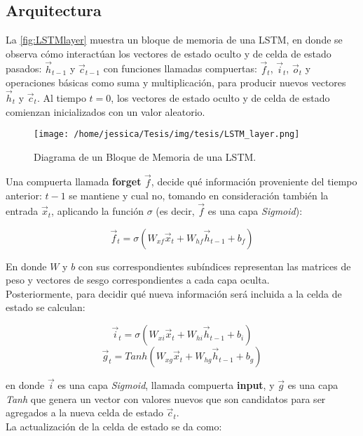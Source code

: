 \subsection{Arquitectura}\label{sec:LSTM_Arch}
La \autoref{fig:LSTMlayer} muestra un bloque de memoria de una \acs{LSTM}, en donde se observa cómo interactúan los vectores de estado oculto y de celda de estado pasados: $\vec{h}_{t-1}$ y $\vec{c}_{t-1}$ con funciones llamadas compuertas: $\vec{f}_t$, $\vec{i}_t$, $\vec{o}_t$ y operaciones básicas como suma y multiplicación, para producir nuevos vectores $\vec{h}_{t}$ y $\vec{c}_{t}$. Al tiempo $t=0$, los vectores de estado oculto y de celda de estado comienzan inicializados con un valor aleatorio.

\begin{figure}[!htbp]
  \centering
  \texttt{[image: /home/jessica/Tesis/img/tesis/LSTM\_layer.png]}
  \caption{Diagrama de un Bloque de Memoria de una \acs{LSTM}.}
  \label{fig:LSTMlayer}
\end{figure}

Una compuerta llamada \textbf{forget} $\vec{f}$, decide qué información proveniente del tiempo anterior: $t-1$ se mantiene y cual no, tomando en consideración también la entrada $\vec{x}_t$, aplicando la función $\sigma$ (es decir, $\vec{f}$ es una capa \emph{Sigmoid}):

\begin{equation}\label{eq:ft}
\vec{f}_t = \sigma(W_{xf}\vec{x}_t + W_{hf}\vec{h}_{t-1} + b_f)
\end{equation}

En donde $W$ y $b$ con sus correspondientes subíndices representan las matrices de peso y vectores de sesgo correspondientes a cada capa oculta. \\
Posteriormente, para decidir qué nueva información será incluida a la celda de estado se calculan:

\begin{equation}\label{eq:it}
\vec{i}_t = \sigma(W_{xi}\vec{x}_t + W_{hi}\vec{h}_{t-1} + b_i)
\end{equation}
\begin{equation}
  \label{eq:gt}
\vec{g}_t = Tanh(W_{xg}\vec{x}_t + W_{hg}\vec{h}_{t-1} + b_g)  
\end{equation}

en donde $\vec{i}$ es una capa \emph{Sigmoid}, llamada compuerta \textbf{input}, y $\vec{g}$ es una capa \emph{Tanh} que genera un vector con valores nuevos que son candidatos para ser agregados a la nueva celda de estado $\vec{c}_t$.
\\
La actualización de la celda de estado se da como:

